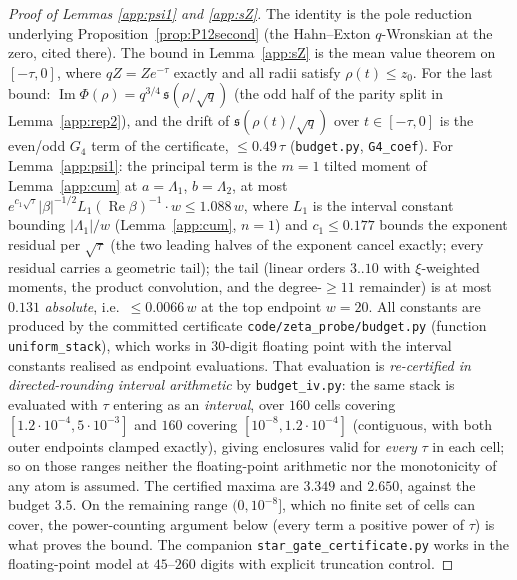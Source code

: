 \documentclass[11pt]{article}
\theoremstyle{plain}
\theoremstyle{definition}
\theoremstyle{remark}
\begin{document}
\begin{proof}[Proof of Lemmas \ref{app:psi1} and \ref{app:sZ}]
The identity is the pole reduction underlying Proposition~\ref{prop:P12second} (the Hahn--Exton
$q$-Wronskian at the zero, cited there). The bound in Lemma~\ref{app:sZ} is the mean value theorem
on $[-\tau,0]$, where $qZ=Ze^{-\tau}$ exactly and all radii satisfy $\rho(t)\le z_0$. For the last
bound: $\operatorname{Im}\Phi(\rho)=q^{3/4}\,\mathfrak s(\rho/\sqrt q)$ (the odd half of the parity
split in Lemma~\ref{app:rep2}), and the drift of $\mathfrak s(\rho(t)/\sqrt q)$ over $t\in[-\tau,0]$
is the even/odd $G_4$ term of the certificate, $\le0.49\,\tau$ (\texttt{budget.py},
\texttt{G4\_coef}). For
Lemma~\ref{app:psi1}: the principal term is the $m=1$ tilted moment of Lemma~\ref{app:cum} at
$a=\Lambda_1$, $b=\Lambda_2$, at most
$e^{c_1\sqrt\tau}|\beta|^{-1/2}L_1(\operatorname{Re}\beta)^{-1}\cdot w\le1.088\,w$, where $L_1$
is the interval constant bounding $|\Lambda_1|/w$ (Lemma~\ref{app:cum}, $n=1$) and
$c_1\le0.177$ bounds the exponent residual per $\sqrt\tau$ (the two leading halves of the exponent
cancel exactly; every residual carries a geometric tail); the tail (linear orders $3..10$ with
$\xi$-weighted moments, the product convolution, and the degree-$\ge11$ remainder) is at most
$0.131$ \emph{absolute}, i.e.\ $\le0.0066\,w$ at the top endpoint $w=20$. All constants are
produced by the committed certificate \texttt{code/zeta\_probe/budget.py} (function
\texttt{uniform\_stack}), which works in $30$-digit floating point with the interval constants
realised as endpoint evaluations. That evaluation is \emph{re-certified in directed-rounding
interval arithmetic} by \texttt{budget\_iv.py}: the same stack is evaluated with $\tau$ entering as
an \emph{interval}, over $160$ cells covering $[1.2\cdot10^{-4},5\cdot10^{-3}]$ and $160$ covering
$[10^{-8},1.2\cdot10^{-4}]$ (contiguous, with both outer endpoints clamped exactly), giving
enclosures valid for \emph{every} $\tau$ in each cell; so on
those ranges neither the floating-point arithmetic nor the monotonicity of any atom is assumed. The
certified maxima are $3.349$ and $2.650$, against the budget $3.5$. On the remaining range
$(0,10^{-8}]$, which no finite set of cells can cover, the power-counting argument below (every
term a positive power of $\tau$) is what proves the bound. The companion
\texttt{star\_gate\_certificate.py} works in the floating-point model at $45$--$260$ digits with
explicit truncation control.
\end{proof}
\end{document}
